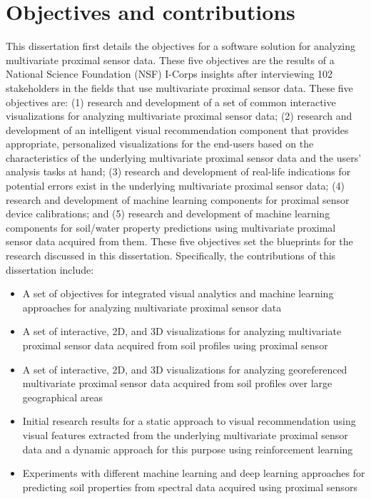 \section{Objectives and contributions}

This dissertation first details the objectives for a software solution for analyzing multivariate proximal sensor data. These five objectives are the results of a National Science Foundation (NSF) I-Corps insights after interviewing 102 stakeholders in the fields that use multivariate proximal sensor data. These five objectives are:
(1) research and development of a set of common interactive visualizations for analyzing multivariate proximal sensor data; (2) research and development of an intelligent visual recommendation component that provides appropriate, personalized visualizations for the end-users based on the characteristics of the underlying multivariate proximal sensor data and the users' analysis tasks at hand; (3) research and development of real-life indications for potential errors exist in the underlying multivariate proximal sensor data; (4) research and development of machine learning components for proximal sensor device calibrations; and (5) research and development of machine learning components for soil/water property predictions using multivariate proximal sensor data acquired from them. These five objectives set the blueprints for the research discussed in this dissertation. Specifically, the contributions of this dissertation include:
\begin{itemize}
    \item A set of objectives for integrated visual analytics and machine learning approaches for analyzing multivariate proximal sensor data

    \item A set of interactive, 2D, and 3D visualizations for analyzing multivariate proximal sensor data acquired from soil profiles using \pxrf{} proximal sensor
    
    \item A set of interactive, 2D, and 3D visualizations for analyzing georeferenced multivariate proximal sensor data acquired from soil profiles over large geographical areas
    
    \item Initial research results for a static approach to visual recommendation using visual features extracted from the underlying multivariate proximal sensor data and a dynamic approach for this purpose using reinforcement learning
    
    \item Experiments with different machine learning and deep learning approaches for predicting soil properties from spectral data acquired using proximal sensors
\end{itemize}


